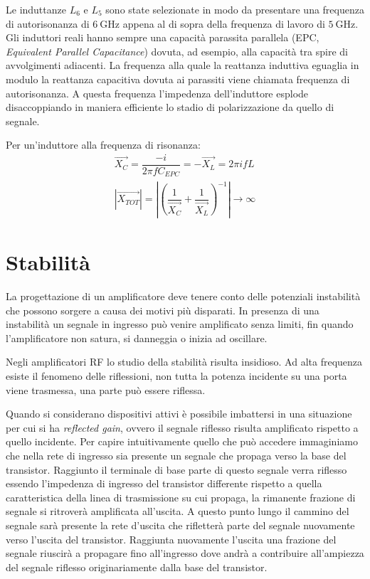 \documentclass[12pt,oneside]{book}
\begin{document}
Le induttanze $L_6$ e $L_5$ sono state selezionate in modo da presentare una frequenza di autorisonanza di $\SI{6}{\giga\hertz}$ appena al di sopra della frequenza di lavoro di $\SI{5}{\giga\hertz}$. Gli induttori reali hanno sempre una capacità parassita parallela (EPC, \textit{Equivalent Parallel Capacitance}) dovuta, ad esempio, alla capacità tra spire di avvolgimenti adiacenti. La frequenza alla quale la reattanza induttiva eguaglia in modulo la reattanza capacitiva dovuta ai parassiti viene chiamata frequenza di autorisonanza. A questa frequenza l'impedenza dell'induttore esplode disaccoppiando in maniera efficiente lo stadio di polarizzazione da quello di segnale.

Per un'induttore alla frequenza di risonanza:
\begin{equation}
    \begin{split}
        \vec{X_C}=\dfrac{-i}{2\pi f C_{EPC}}=-\vec{X_L}=2 \pi i f L\\
        \left|\vec{X_{TOT}}\right|=\left|\left(\dfrac{1}{\vec{X_C}}+\dfrac{1}{\vec{X_L}}\right)^{-1}\right|\to\infty 
    \end{split}
\end{equation} 

\section{Stabilità}
La progettazione di un amplificatore deve tenere conto delle potenziali instabilità che possono sorgere a causa dei motivi più disparati. In presenza di una instabilità un segnale in ingresso può venire amplificato senza limiti, fin quando l'amplificatore non satura, si danneggia o inizia ad oscillare.

Negli amplificatori RF lo studio della stabilità risulta insidioso. Ad alta frequenza esiste il fenomeno delle riflessioni, non tutta la potenza incidente su una porta viene trasmessa, una parte può essere riflessa. 

Quando si considerano dispositivi attivi è possibile imbattersi in una situazione per cui si ha \textit{reflected gain}, ovvero il segnale riflesso risulta amplificato rispetto a quello incidente. Per capire intuitivamente quello che può accedere immaginiamo che nella rete di ingresso sia presente un segnale che propaga verso la base del transistor. Raggiunto il terminale di base parte di questo segnale verra riflesso essendo l'impedenza di ingresso del transistor differente rispetto a quella caratteristica della linea di trasmissione su cui propaga, la rimanente frazione di segnale si ritroverà amplificata all'uscita. A questo punto lungo il cammino del segnale sarà presente la rete d'uscita che rifletterà parte del segnale nuovamente verso l'uscita del transistor. Raggiunta nuovamente l'uscita una frazione del segnale riuscirà a propagare fino all'ingresso dove andrà a contribuire all'ampiezza del segnale riflesso originariamente dalla base del transistor.
\end{document}

